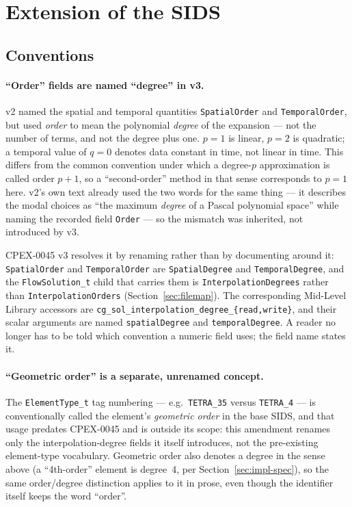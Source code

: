 \documentclass[11pt,letterpaper]{article}
\begin{document}
\section{Extension of the SIDS}

\subsection{Conventions}
\label{sec:conventions}

\paragraph{``Order'' fields are named ``degree'' in v3.}
\label{sec:order-means-degree}
v2 named the spatial and temporal quantities \texttt{SpatialOrder} and \texttt{TemporalOrder},
but used \emph{order} to mean the polynomial \emph{degree} of the expansion --- not the number
of terms, and not the degree plus one.  $p=1$ is linear, $p=2$ is quadratic; a temporal value of
$q=0$ denotes data constant in time, not linear in time.  This differs from the common
convention under which a degree-$p$ approximation is called order $p+1$, so a
``second-order'' method in that sense corresponds to $p=1$ here.  v2's own text already used
the two words for the same thing --- it describes the modal choices as ``the maximum
\emph{degree} of a Pascal polynomial space'' while naming the recorded field \texttt{Order} ---
so the mismatch was inherited, not introduced by v3.

CPEX-0045 v3 resolves it by renaming rather than by documenting around it:
\texttt{SpatialOrder} and \texttt{TemporalOrder} are \texttt{SpatialDegree} and
\texttt{TemporalDegree}, and the \texttt{FlowSolution\_t} child that carries them is
\texttt{InterpolationDegrees} rather than \texttt{InterpolationOrders}
(Section~\ref{sec:filemap}).  The corresponding Mid-Level Library accessors are
\texttt{cg\_sol\_interpolation\_degree\_\{read,write\}}, and their scalar arguments are named
\texttt{spatialDegree} and \texttt{temporalDegree}.  A reader no longer has to be told which
convention a numeric field uses; the field name states it.

\paragraph{``Geometric order'' is a separate, unrenamed concept.}
The \texttt{ElementType\_t} tag numbering --- e.g.\ \texttt{TETRA\_35} versus \texttt{TETRA\_4}
--- is conventionally called the element's \emph{geometric order} in the base SIDS, and that
usage predates CPEX-0045 and is outside its scope: this amendment renames only the
interpolation-degree fields it itself introduces, not the pre-existing element-type
vocabulary.  Geometric order also denotes a degree in the sense above (a ``4th-order''
element is degree~4, per Section~\ref{sec:impl-spec}), so the same order/degree distinction
applies to it in prose, even though the identifier itself keeps the word ``order''.
\end{document}
